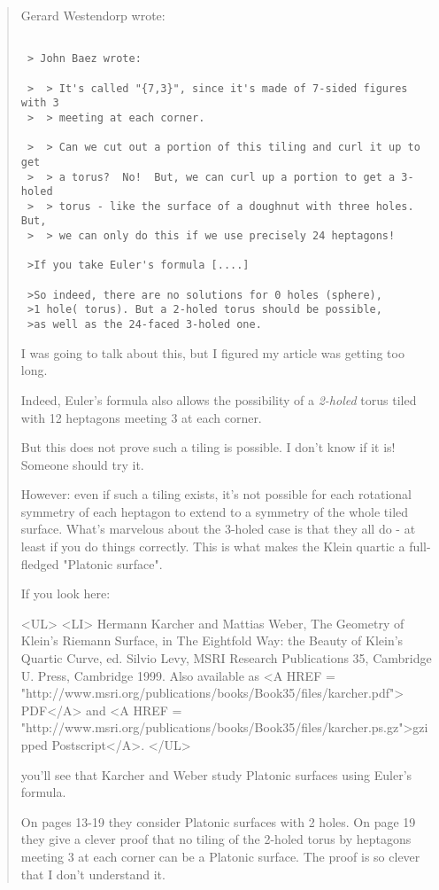 \begin{quote}
Gerard Westendorp wrote:


\begin{verbatim}

 > John Baez wrote:

 >  > It's called "{7,3}", since it's made of 7-sided figures with 3
 >  > meeting at each corner.

 >  > Can we cut out a portion of this tiling and curl it up to get
 >  > a torus?  No!  But, we can curl up a portion to get a 3-holed
 >  > torus - like the surface of a doughnut with three holes.  But,
 >  > we can only do this if we use precisely 24 heptagons!

 >If you take Euler's formula [....]

 >So indeed, there are no solutions for 0 holes (sphere),
 >1 hole( torus). But a 2-holed torus should be possible,
 >as well as the 24-faced 3-holed one.
\end{verbatim}
    

I was going to talk about this, but I figured my article
was getting too long.  

Indeed, Euler's formula also allows the possibility of a 
\emph{2-holed} torus tiled with 12 heptagons meeting 3 at each corner.  

But this does not prove such a tiling is possible.  I don't know 
if it is!  Someone should try it.

However: even if such a tiling exists, it's not possible for each 
rotational symmetry of each heptagon to extend to a symmetry 
of the whole tiled surface.   What's marvelous about the 3-holed
case is that they all do - at least if you do things correctly.
This is what makes the Klein quartic a full-fledged "Platonic 
surface".

If you look here:

<UL>
<LI>
Hermann Karcher and Mattias Weber, The Geometry of Klein's Riemann Surface,
in The Eightfold Way: the Beauty of Klein's Quartic Curve, 
ed. Silvio Levy, MSRI Research Publications 35, Cambridge U. Press, 
Cambridge 1999. Also available as
<A HREF = "http://www.msri.org/publications/books/Book35/files/karcher.pdf">
PDF</A> and
<A HREF = 
"http://www.msri.org/publications/books/Book35/files/karcher.ps.gz">gzipped
Postscript</A>.
</UL>

you'll see that Karcher and Weber study Platonic surfaces using Euler's 
formula.

On pages 13-19 they consider Platonic surfaces with 2 holes.
On page 19 they give a clever proof that no tiling of the 2-holed torus 
by heptagons meeting 3 at each corner can be a Platonic surface. 
The proof is so clever that I don't understand it.


\end{quote}
